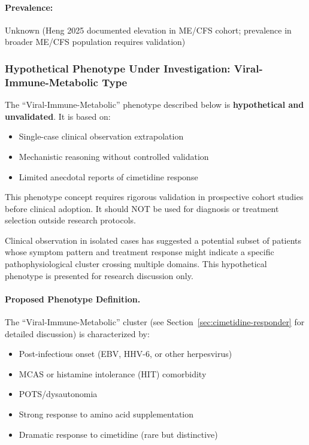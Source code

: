 \paragraph{Prevalence:} Unknown (Heng 2025 documented elevation in ME/CFS cohort; prevalence in broader ME/CFS population requires validation)

\subsubsection{Hypothetical Phenotype Under Investigation: Viral-Immune-Metabolic Type}
\label{sec:vim-phenotype}

\begin{warning}
The ``Viral-Immune-Metabolic'' phenotype described below is \textbf{hypothetical and unvalidated}. It is based on:
\begin{itemize}
    \item Single-case clinical observation extrapolation
    \item Mechanistic reasoning without controlled validation
    \item Limited anecdotal reports of cimetidine response
\end{itemize}

This phenotype concept requires rigorous validation in prospective cohort studies before clinical adoption. It should NOT be used for diagnosis or treatment selection outside research protocols.
\end{warning}

Clinical observation in isolated cases has suggested a potential subset of patients whose symptom pattern and treatment response might indicate a specific pathophysiological cluster crossing multiple domains. This hypothetical phenotype is presented for research discussion only.

\paragraph{Proposed Phenotype Definition.}

The ``Viral-Immune-Metabolic'' cluster (see Section~\ref{sec:cimetidine-responder} for detailed discussion) is characterized by:
\begin{itemize}
    \item Post-infectious onset (EBV, HHV-6, or other herpesvirus)
    \item MCAS or histamine intolerance (HIT) comorbidity
    \item POTS/dysautonomia
    \item Strong response to amino acid supplementation
    \item Dramatic response to cimetidine (rare but distinctive)
\end{itemize}

